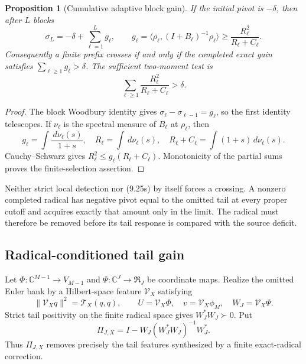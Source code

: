 \documentclass[11pt]{amsart}
\newtheorem{proposition}[theorem]{Proposition}
\theoremstyle{definition}
\theoremstyle{remark}
\newcommand{\C}{\mathbb C}
\newcommand{\dd}{\,d}
\begin{document}
\begin{proposition}[Cumulative adaptive block gain]
\label{prop:cumulative-gain}
If the initial pivot is \(-\delta\), then after \(L\) blocks
\[
\boxed{
 \sigma_L=-\delta+\sum_{\ell=1}^L g_\ell,
 \qquad
 g_\ell=\langle\rho_\ell,(I+B_\ell)^{-1}\rho_\ell\rangle
 \ge\frac{R_\ell^2}{R_\ell+C_\ell}.}
\tag{9.25s}
\]
Consequently a finite prefix crosses if and only if the completed exact
gain satisfies \(\sum_{\ell\ge1}g_\ell>\delta\).  The sufficient
two-moment test is
\[
 \sum_{\ell\ge1}\frac{R_\ell^2}{R_\ell+C_\ell}>\delta.
\tag{9.25t}
\]
\end{proposition}

\begin{proof}
The block Woodbury identity gives
\(\sigma_\ell-\sigma_{\ell-1}=g_\ell\), so the first identity telescopes.
If \(\nu_\ell\) is the spectral measure of \(B_\ell\) at
\(\rho_\ell\), then
\[
 g_\ell=\int\frac{\dd\nu_\ell(s)}{1+s},\quad
 R_\ell=\int\dd\nu_\ell(s),\quad
 R_\ell+C_\ell=\int(1+s)\dd\nu_\ell(s).
\]
Cauchy--Schwarz gives \(R_\ell^2\le
g_\ell(R_\ell+C_\ell)\).  Monotonicity of the partial sums proves the
finite-selection assertion.
\end{proof}

Neither strict local detection nor (9.25s) by itself forces a crossing.
A nonzero completed radical has negative pivot equal to the omitted tail
at every proper cutoff and acquires exactly that amount only in the
limit.  The radical must therefore be removed before its tail response is
compared with the source deficit.

\subsection{Radical-conditioned tail gain}

Let \(\Phi:\C^{M-1}\to V_{M-1}\) and
\(\Psi:\C^J\to\mathfrak R_J\) be coordinate maps.  Realize the omitted
Euler bank by a Hilbert-space feature \(\mathcal V_X\) satisfying
\[
 \|\mathcal V_Xq\|^2=\mathcal T_X(q,q),
 \qquad
 U=\mathcal V_X\Phi,\quad v=\mathcal V_X\phi_M,
 \quad W_J=\mathcal V_X\Psi.
\tag{9.25u}
\]
Strict tail positivity on the finite radical space gives
\(W_J^*W_J\succ0\).  Put
\[
 \Pi_{J,X}=I-W_J(W_J^*W_J)^{-1}W_J^*.
\tag{9.25v}
\]
Thus \(\Pi_{J,X}\) removes precisely the tail features synthesized by a
finite exact-radical correction.
\end{document}
